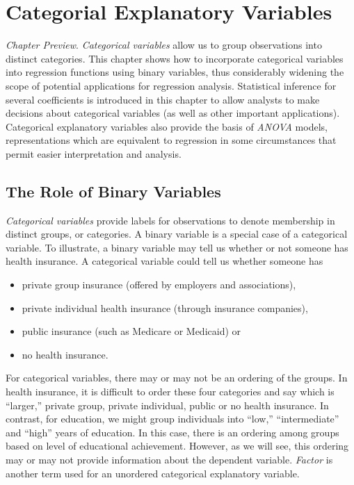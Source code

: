 \setcounter{chapter}{3}

\chapter{Categorial Explanatory Variables}


{\small \textit{Chapter Preview}. \textit{Categorical variables}
allow us to group observations into distinct categories. This
chapter shows how to incorporate categorical variables into
regression functions using binary variables, thus considerably
widening the scope of potential applications for regression
analysis. Statistical inference for several coefficients is
introduced in this chapter to allow analysts to make decisions about
categorical variables (as well as other important applications).
Categorical explanatory variables also provide the basis of
\textit{ANOVA} models, representations which are equivalent to
regression in some circumstances that permit easier interpretation
and analysis.}

\section{The Role of Binary Variables}\label{S4:BinaryVar}


\textit{Categorical variables} provide labels for observations to
denote membership in distinct groups, or categories. A binary
variable is a special case of a categorical variable. To illustrate,
a binary variable may tell us whether or not someone has health
insurance. A categorical variable could tell us whether someone has
\begin{itemize}
\item private group insurance (offered by employers and
associations), \item private individual health insurance (through
insurance companies), \item public insurance (such as Medicare or
Medicaid) or \item no health insurance.
\end{itemize}

\noindent For categorical variables, there may or may not be an
ordering of the groups. In health insurance, it is difficult to
order these four categories and say which is ``larger,'' private
group, private individual, public or no health insurance. In
contrast, for education, we might group individuals into ``low,''
``intermediate'' and ``high'' years of education. In this case,
there is an ordering among groups based on level of educational
achievement. However, as we will see, this ordering may or may not
provide information about the dependent variable. \textit{Factor} is
another term used for an unordered categorical explanatory variable.

